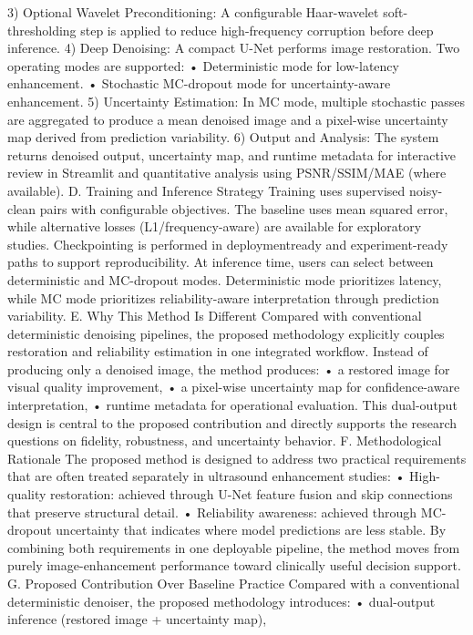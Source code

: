 3) Optional Wavelet Preconditioning: A configurable
Haar-wavelet soft-thresholding step is applied to reduce
high-frequency corruption before deep inference.
4) Deep Denoising: A compact U-Net performs image
restoration. Two operating modes are supported:
• Deterministic mode for low-latency enhancement.
• Stochastic MC-dropout mode for uncertainty-aware
enhancement.
5) Uncertainty Estimation: In MC mode, multiple
stochastic passes are aggregated to produce a mean denoised image and a pixel-wise uncertainty map derived
from prediction variability.
6) Output and Analysis: The system returns denoised
output, uncertainty map, and runtime metadata for interactive review in Streamlit and quantitative analysis
using PSNR/SSIM/MAE (where available).
D. Training and Inference Strategy
Training uses supervised noisy-clean pairs with configurable
objectives. The baseline uses mean squared error, while alternative losses (L1/frequency-aware) are available for exploratory studies. Checkpointing is performed in deploymentready and experiment-ready paths to support reproducibility.
At inference time, users can select between deterministic
and MC-dropout modes. Deterministic mode prioritizes latency, while MC mode prioritizes reliability-aware interpretation through prediction variability.
E. Why This Method Is Different
Compared with conventional deterministic denoising
pipelines, the proposed methodology explicitly couples
restoration and reliability estimation in one integrated
workflow. Instead of producing only a denoised image, the
method produces:
• a restored image for visual quality improvement,
• a pixel-wise uncertainty map for confidence-aware interpretation,
• runtime metadata for operational evaluation.
This dual-output design is central to the proposed contribution and directly supports the research questions on fidelity,
robustness, and uncertainty behavior.
F. Methodological Rationale
The proposed method is designed to address two practical
requirements that are often treated separately in ultrasound
enhancement studies:
• High-quality restoration: achieved through U-Net feature fusion and skip connections that preserve structural
detail.
• Reliability awareness: achieved through MC-dropout
uncertainty that indicates where model predictions are
less stable.
By combining both requirements in one deployable pipeline,
the method moves from purely image-enhancement performance toward clinically useful decision support.
G. Proposed Contribution Over Baseline Practice
Compared with a conventional deterministic denoiser, the
proposed methodology introduces:
• dual-output inference (restored image + uncertainty map),
